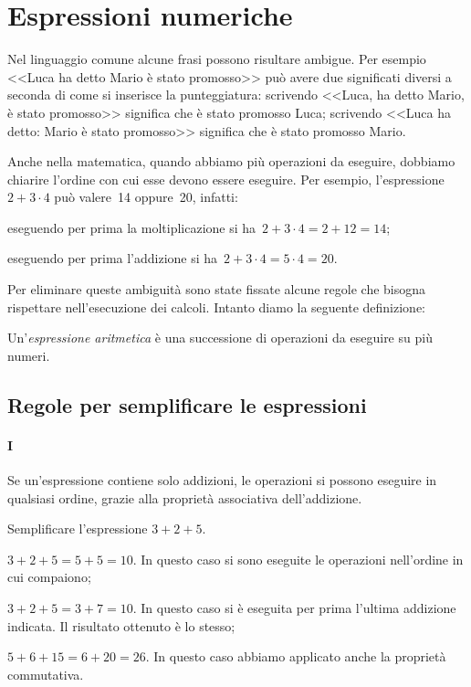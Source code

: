 \ovalbox{\risolvii \ref{ese:1.21}, \ref{ese:1.22}, \ref{ese:1.23}, \ref{ese:1.24}, \ref{ese:1.25}, \ref{ese:1.26}}

\section{Espressioni numeriche}

Nel linguaggio comune alcune frasi possono risultare ambigue. Per esempio
<<Luca ha detto Mario è stato promosso>> può avere due significati diversi
a seconda di come si inserisce la punteggiatura:
scrivendo <<Luca, ha detto Mario, è stato promosso>> significa che è stato promosso Luca;
scrivendo <<Luca ha detto: Mario è stato promosso>> significa che è stato promosso Mario.

Anche nella matematica, quando abbiamo più operazioni da eseguire, dobbiamo chiarire l'ordine con
cui esse devono essere eseguire. Per esempio, l'espressione~$2+3\cdot 4$ può valere~14 oppure~20, infatti:
\begin{itemize*}
 \item eseguendo per prima la moltiplicazione si ha~$2+3\cdot 4=2+12=14$;
 \item eseguendo per prima l'addizione si ha~$2+3\cdot 4=5\cdot 4=20$.
\end{itemize*}

Per eliminare queste ambiguità sono state fissate alcune regole che bisogna rispettare
nell'esecuzione dei calcoli. Intanto diamo la seguente definizione:

\begin{definizione}
 Un'\emph{espressione aritmetica} è una successione di operazioni da eseguire su più numeri.
\end{definizione}

\subsection{Regole per semplificare le espressioni}
\paragraph {I} Se un'espressione contiene solo addizioni, le operazioni si possono eseguire
in qualsiasi ordine, grazie alla proprietà associativa dell'addizione.
\begin{exrig}
 \begin{esempio}
 Semplificare l'espressione $3+2+5$.
\begin{itemize*}
 \item $3+2+5=5+5=10$. In questo caso si sono eseguite le operazioni nell'ordine in cui compaiono;
 \item $3+2+5=3+7=10$. In questo caso si è eseguita per prima l'ultima addizione indicata. Il risultato ottenuto è lo stesso;
 \item $5+6+15=6+20=26$. In questo caso abbiamo applicato anche la proprietà commutativa.
\end{itemize*}
 \end{esempio}
\end{exrig}


